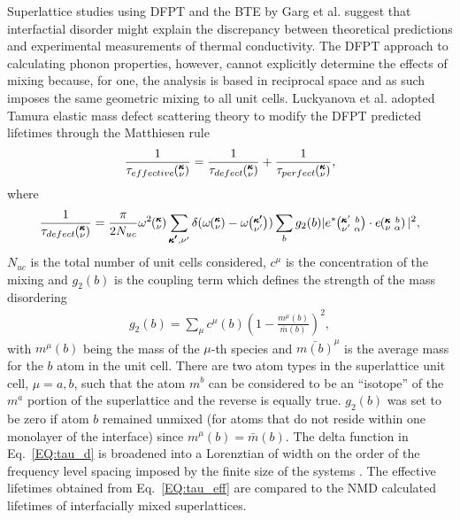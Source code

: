 \documentclass[aps,prb,preprint,preprintnumbers,amsmath,amssymb,floatfix,superscriptaddress]{revtex4}
\newcommand{\kvba}{\mspace{-4.0mu}\left(\mspace{-8.0mu}
\begin{smallmatrix} &\pmb{\kappa} &b \\ &\nu &\alpha\end{smallmatrix}
\mspace{-3.0mu}\right)}
\newcommand{\kvbap}{\mspace{-4.0mu}\left(\mspace{-8.0mu}
\begin{smallmatrix} &\pmb{\kappa}' &b \\ &\nu' &\alpha\end{smallmatrix}
\mspace{-3.0mu}\right)}
\newcommand{\kv}{\mspace{-4.0mu}\left(\mspace{-8.0mu}
\begin{smallmatrix}&\pmb{\kappa} \\&\nu\end{smallmatrix}
\mspace{-3.0mu}\right)}
\newcommand{\kvp}{\mspace{-4.0mu}\left(\mspace{-8.0mu}
\begin{smallmatrix}&\pmb{\kappa'} \\&\nu'\end{smallmatrix}
\mspace{-3.0mu}\right)}
\begin{document}
Superlattice studies using DFPT and the BTE by Garg et al. \cite{doi:10.1021/nl202186y} suggest that interfactial disorder might explain the discrepancy between theoretical predictions and experimental measurements of thermal conductivity. The DFPT approach to calculating phonon properties, however, cannot explicitly determine the effects of mixing because, for one, the analysis is based in reciprocal space and as such imposes the same geometric mixing to all unit cells. Luckyanova et al. \cite{Luckyanova16112012} adopted Tamura elastic mass defect scattering theory \cite{tamura_isotope_1983} to modify the DFPT predicted lifetimes through the Matthiesen rule
\begin{equation}\label{EQ:tau_eff}
\begin{split}
\frac{1}{\tau_{effective}\kv} = \frac{1}{\tau_{defect}\kv}+\frac{1}{\tau_{perfect}\kv} ,
\end{split}
\end{equation}
where
\begin{equation}\label{EQ:tau_d}
\begin{split}
\frac{1}{\tau_{defect}\kv} = \frac{\pi}{2N_{uc}}\omega^2\kv 
\sum_{\pmb{\kappa'},\nu'} \delta( \omega\kv - \omega\kvp )\sum_{b} g_2(b) 
|e^*\kvbap \cdot e\kvba |^2 ,
\end{split}
\end{equation}
$N_{uc}$ is the total number of unit cells considered, $c^\mu$ is the concentration of the mixing and $g_2(b)$ is the coupling term which defines the strength of the mass disordering
\begin{equation}\label{EQ:g(b)}
\begin{split}
g_2(b) = \sum_\mu c^{\mu}(b)\left(1-\frac{m^{\mu}(b)}{\bar{m}(b)}\right)^2, 
\end{split}
\end{equation}
with $m^\mu(b)$ being the mass of the $\mu$-th species and $\bar{m(b)}^{\mu}$ is the average mass for the $b$ atom in the unit cell. There are two atom types in the superlattice unit cell, $\mu=a,b$, such that the atom $m^b$ can be considered to be an ``isotope'' of the $m^a$ portion of the superlattice and the reverse is equally true. $g_2(b)$ was set to be zero if atom $b$ remained unmixed (for atoms that do not reside within one monolayer of the interface) since $m^{\mu}(b)=\bar{m}(b)$. The delta function in Eq.~\ref{EQ:tau_d} is broadened into a Lorenztian of width on the order of the frequency level spacing imposed by the finite size of the systems \cite{allen_thermal_1993}. The effective lifetimes obtained from Eq.~\ref{EQ:tau_eff} are compared to the NMD calculated lifetimes of interfacially mixed superlattices.
\end{document}
